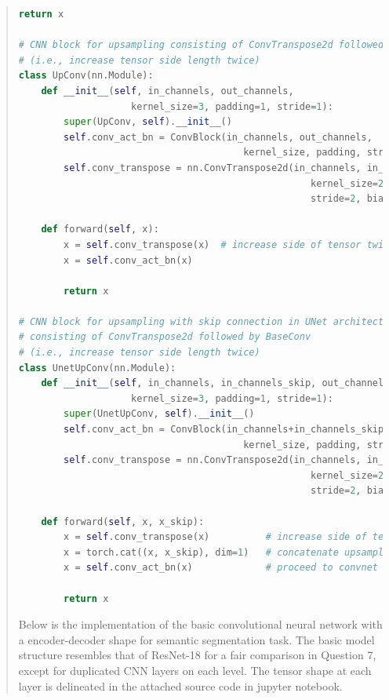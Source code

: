 \documentclass[11pt]{article}
\begin{document}
\begin{quote}
\begin{lstlisting}[language=Python, basicstyle=\scriptsize]
        return x

# CNN block for upsampling consisting of ConvTranspose2d followed by BaseConv 
# (i.e., increase tensor side length twice)
class UpConv(nn.Module):
    def __init__(self, in_channels, out_channels, 
                    kernel_size=3, padding=1, stride=1):
        super(UpConv, self).__init__()
        self.conv_act_bn = ConvBlock(in_channels, out_channels, 
                                        kernel_size, padding, stride)
        self.conv_transpose = nn.ConvTranspose2d(in_channels, in_channels, 
                                                    kernel_size=2, padding=0, 
                                                    stride=2, bias=False)
        
    def forward(self, x):
        x = self.conv_transpose(x)  # increase side of tensor twice
        x = self.conv_act_bn(x)

        return x

# CNN block for upsampling with skip connection in UNet architecture, 
# consisting of ConvTranspose2d followed by BaseConv 
# (i.e., increase tensor side length twice)
class UnetUpConv(nn.Module):
    def __init__(self, in_channels, in_channels_skip, out_channels, 
                    kernel_size=3, padding=1, stride=1):
        super(UnetUpConv, self).__init__()
        self.conv_act_bn = ConvBlock(in_channels+in_channels_skip, out_channels, 
                                        kernel_size, padding, stride)
        self.conv_transpose = nn.ConvTranspose2d(in_channels, in_channels, 
                                                    kernel_size=2, padding=0, 
                                                    stride=2, bias=False)
        
    def forward(self, x, x_skip):
        x = self.conv_transpose(x)          # increase side of tensor twice
        x = torch.cat((x, x_skip), dim=1)   # concatenate upsampled and skipped tensor
        x = self.conv_act_bn(x)             # proceed to convnet operation

        return x
\end{lstlisting}

Below is the implementation of the basic convolutional neural network with a encoder-decoder shape for semantic segmentation task. The basic model structure resembles that of ResNet-18 for a fair comparison in Question 7, except for duplicated CNN layers on each level. The tensor shape at each layer is delineated in the attached source code in jupyter notebook.


\end{quote}
\end{document}
